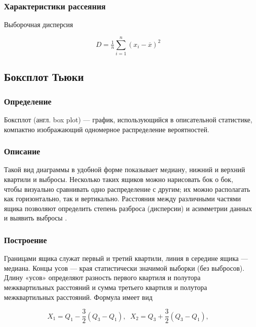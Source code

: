 \documentclass[a4paper,14pt]{article}
\begin{document}
	\subsubsection{Характеристики рассеяния}
	
	Выборочная дисперсия
	
	\begin{equation}
		D = \tfrac{1}{n}\sum\limits_{i=1}^{n} (x_i - \overline{x})^2
	\end{equation}
	
	\subsection{Боксплот Тьюки}
	
	\subsubsection{Определение}
	
	Боксплот (англ. box plot) --- график, использующийся в описательной статистике, компактно изображающий одномерное распределение вероятностей.
	
	\subsubsection{Описание}
	
	Такой вид диаграммы в удобной форме показывает медиану, нижний и верхний квартили и выбросы. Несколько таких ящиков можно нарисовать бок о бок, чтобы визуально сравнивать одно распределение с другим; их можно располагать как горизонтально, так и вертикально. Расстояния между различными частями ящика позволяют определить степень разброса (дисперсии) и асимметрии данных и выявить выбросы \cite{s:boxplot}. 
	
	\subsubsection{Построение}
	
	Границами ящика служат первый и третий квартили, линия в середине ящика --- медиана. Концы усов --- края статистически значимой выборки (без выбросов). Длину «усов» определяют разность первого квартиля и полутора межквартильных расстояний и сумма третьего квартиля и полутора межквартильных расстояний. Формула имеет вид
	
	\begin{equation} \label{eq:boundBoxplot}
		X_1 = Q_1 - \dfrac{3}{2}(Q_3 - Q_1), \;\; X_2 = Q_3 + \dfrac{3}{2}(Q_3 - Q_1),
	\end{equation}
	
\end{document}
